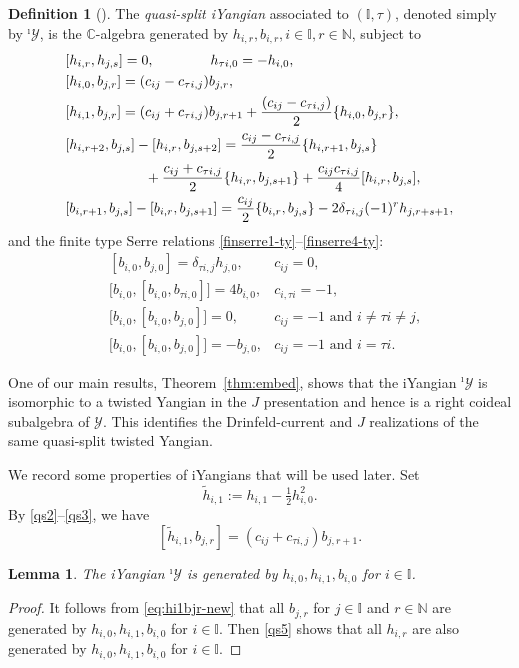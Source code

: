 \documentclass[11pt,reqno]{amsart}
\numberwithin{equation}{section}
\newtheorem{lem}[thm]{Lemma}
\theoremstyle{definition}
\newtheorem{dfn}[thm]{Definition}
\theoremstyle{remark}
\newcommand{\beq}{\begin{equation}}
\newcommand{\eeq}{\end{equation}}
\newcommand{\be}{\begin{equation*}}
\newcommand{\ee}{\end{equation*}}
\newcommand{\bN}{\mathbb{N}}
\newcommand{\hf}{\tfrac12}
\newcommand{\tl}{\tilde}
\newcommand{\I}{{\mathbb I}}
\newcommand{\Y}{{\mathscr{Y}}}
\newcommand{\Yi}{{^\imath\mathscr{Y}}}
\begin{document}
\begin{dfn}[{\cite[Theorem~3.9]{LZ24}}]\label{def:YN}
The \emph{quasi-split iYangian} associated to $(\I,\tau)$, denoted simply by $\Yi$, is the $\mathbb{C}$-algebra generated by $h_{i,r},b_{i,r},i\in \mathbb{I},r\in \bN$, subject to
\begin{align}\label{qs1}
& [h_{i,r},h_{j,s}]=0,\qquad\qquad  h_{\tau i,0}=-h_{i,0},
\\\label{qs2}
& [h_{i,0},b_{j,r}]=  (c_{ij}-c_{\tau i,j}) b_{j,r},
\\\label{qs3}
& [h_{i,1},b_{j,r}]=  (c_{ij}+c_{\tau i,j}) b_{j,r+1}+\frac{(c_{ij}-c_{\tau i,j})}{2}\{h_{i,0},b_{j,r}\},
\\\notag
& [h_{i,r+2},b_{j,s}] - [h_{i,r},b_{j,s+2}]=\frac{c_{ij}-c_{\tau i,j}}{2}\{h_{i,r+1},b_{j,s}\}
\\\label{qs4}
&\hskip2cm +\frac{c_{ij}+c_{\tau i,j}}{2}\{h_{i,r},b_{j,s+1}\}+\frac{c_{ij}c_{\tau i,j}}{4}[h_{i,r}, b_{j,s}],
\\\label{qs5}
& [b_{i,r+1 },b_{j,s}]  - [b_{i,r },b_{j,s+1 }] 
 =\frac{c_{ij}}{2}\{b_{i,r },b_{j,s }\}-2 \delta_{\tau i,j}(-1)^{r}h_{j,r+s+1 },
\end{align}
and the finite type Serre relations \eqref{finserre1-ty}--\eqref{finserre4-ty}: 
\begin{align}
&[b_{i,0},b_{j,0}]=\delta_{\tau i, j}h_{j,0}, &c_{ij}=0,\label{finserre1-ty}
\\
&\big[b_{i,0},[b_{i,0},b_{\tau i,0}]\big]  
= 4b_{i,0}, &c_{i,\tau i}=-1,\label{finserre2-ty}\\
&\big[b_{i,0},[b_{i,0},b_{j,0}]\big] =0, & c_{ij}=-1 \text{ and }i\ne \tau i\ne j, \label{finserre3-ty}\\
&\big[b_{i,0},[b_{i,0},b_{j,0}]\big] =-b_{j,0}, & c_{ij}=-1 \text{ and }i=\tau i.\label{finserre4-ty}
\end{align}
\end{dfn}

One of our main results, Theorem~\ref{thm:embed}, shows that the
iYangian $\Yi$ is isomorphic to a twisted Yangian in the
$J$ presentation and hence is a right coideal subalgebra of $\Y$.
This identifies the Drinfeld-current and $J$ realizations of the
same quasi-split twisted Yangian.

\medskip

We record some properties of iYangians that will be used later. Set
\be
\tl h_{i,1}:=h_{i,1}-\hf h_{i,0}^2.
\ee
By \eqref{qs2}--\eqref{qs3}, we have
\beq\label{eq:hi1bjr-new}
[\tl h_{i,1},b_{j,r}]=(c_{ij}+c_{\tau i,j})b_{j,r+1}.
\eeq
\begin{lem}\label{lem:generate}
The iYangian $\Yi$ is generated by $h_{i,0},h_{i,1},b_{i,0}$ for $i\in \I$.
\end{lem}
\begin{proof}
It follows from \eqref{eq:hi1bjr-new} that all $b_{j,r}$ for $j\in \I$ and $r\in\bN$ are generated by $h_{i,0},h_{i,1},b_{i,0}$ for $i\in \I$. Then \eqref{qs5} shows that all $h_{i,r}$ are also generated by $h_{i,0},h_{i,1},b_{i,0}$ for $i\in \I$.  
\end{proof}
\end{document}
